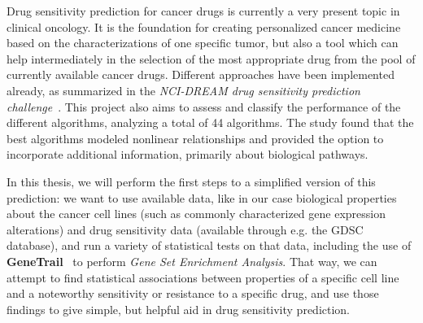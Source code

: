 Drug sensitivity prediction for cancer drugs is currently a very present topic in clinical oncology. It is the foundation for creating personalized cancer medicine based on the characterizations of one specific tumor, but also a tool which can help intermediately in the selection of the most appropriate drug from the pool of currently available cancer drugs. Different approaches have been implemented already, as summarized in the \emph{NCI-DREAM drug sensitivity prediction challenge}~\cite{nci_dream}. This project also aims to assess and classify the performance of the different algorithms, analyzing a total of 44 algorithms. The study found that the best algorithms modeled nonlinear relationships and provided the option to incorporate additional information, primarily about biological pathways.


In this thesis, we will perform the first steps to a simplified version of this prediction: we want to use available data, like in our case biological properties about the cancer cell lines (such as commonly characterized gene expression alterations) and drug sensitivity data (available through e.g. the \textsc{GDSC} database), and run a variety of statistical tests on that data, including the use of \textbf{GeneTrail}~\cite{genetrail} to perform \textit{Gene Set Enrichment Analysis}. That way, we can attempt to find statistical associations between properties of a specific cell line and a noteworthy sensitivity or resistance to a specific drug, and use those findings to give simple, but helpful aid in drug sensitivity prediction.%